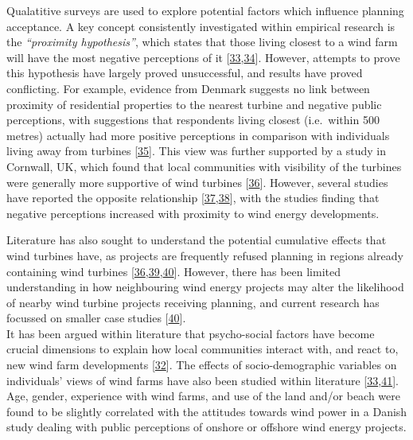 \documentclass[a4paper,]{article}
\theoremstyle{definition}
\theoremstyle{definition}
\theoremstyle{definition}
\theoremstyle{remark}
\begin{document}
Qualatitive surveys are used to explore potential factors which
influence planning acceptance. A key concept consistently investigated
within empirical research is the \emph{``proximity hypothesis''}, which
states that those living closest to a wind farm will have the most
negative perceptions of it
{[}\protect\hyperlink{ref-Devine-Wright2005}{33},\protect\hyperlink{ref-Warren2005}{34}{]}.
However, attempts to prove this hypothesis have largely proved
unsuccessful, and results have proved conflicting. For example, evidence
from Denmark suggests no link between proximity of residential
properties to the nearest turbine and negative public perceptions, with
suggestions that respondents living closest (i.e.~within 500 metres)
actually had more positive perceptions in comparison with individuals
living away from turbines {[}\protect\hyperlink{ref-Krohn1999}{35}{]}.
This view was further supported by a study in Cornwall, UK, which found
that local communities with visibility of the turbines were generally
more supportive of wind turbines
{[}\protect\hyperlink{ref-Eltham2008}{36}{]}. However, several studies
have reported the opposite relationship
{[}\protect\hyperlink{ref-Meyerhoff2010}{37},\protect\hyperlink{ref-Ladenburg2006}{38}{]},
with the studies finding that negative perceptions increased with
proximity to wind energy developments.

Literature has also sought to understand the potential cumulative
effects that wind turbines have, as projects are frequently refused
planning in regions already containing wind turbines
{[}\protect\hyperlink{ref-Eltham2008}{36},\protect\hyperlink{ref-Strachan2004}{39},\protect\hyperlink{ref-Jones2011}{40}{]}.
However, there has been limited understanding in how neighbouring wind
energy projects may alter the likelihood of nearby wind turbine projects
receiving planning, and current research has focussed on smaller case
studies {[}\protect\hyperlink{ref-Jones2011}{40}{]}.\\
It has been argued within literature that psycho-social factors have
become crucial dimensions to explain how local communities interact
with, and react to, new wind farm developments
{[}\protect\hyperlink{ref-Langer2016}{32}{]}. The effects of
socio-demographic variables on individuals' views of wind farms have
also been studied within literature
{[}\protect\hyperlink{ref-Devine-Wright2005}{33},\protect\hyperlink{ref-Warren2010}{41}{]}.
Age, gender, experience with wind farms, and use of the land and/or
beach were found to be slightly correlated with the attitudes towards
wind power in a Danish study dealing with public perceptions of onshore
or offshore wind energy projects.
\end{document}
